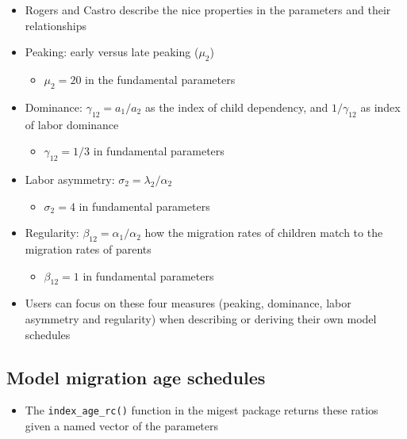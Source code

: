 \documentclass[
]{book}
\providecommand{\tightlist}{%
  \setlength{\itemsep}{0pt}\setlength{\parskip}{0pt}}
\begin{document}
\begin{itemize}
\tightlist
\item
  Rogers and Castro describe the nice properties in the parameters and their relationships
\item
  Peaking: early versus late peaking (\(\mu_2\))

  \begin{itemize}
  \tightlist
  \item
    \(\mu_2 = 20\) in the fundamental parameters
  \end{itemize}
\item
  Dominance: \(\gamma_{12} = a_1/a_2\) as the index of child dependency, and \(1/\gamma_{12}\) as index of labor dominance

  \begin{itemize}
  \tightlist
  \item
    \(\gamma_{12} = 1/3\) in fundamental parameters
  \end{itemize}
\item
  Labor asymmetry: \(\sigma_2 = \lambda_2/\alpha_2\)

  \begin{itemize}
  \tightlist
  \item
    \(\sigma_{2} = 4\) in fundamental parameters
  \end{itemize}
\item
  Regularity: \(\beta_{12} = \alpha_1/\alpha_2\) how the migration rates of children match to the migration rates of parents

  \begin{itemize}
  \tightlist
  \item
    \(\beta_{12} = 1\) in fundamental parameters
  \end{itemize}
\item
  Users can focus on these four measures (peaking, dominance, labor asymmetry and regularity) when describing or deriving their own model schedules
\end{itemize}

\hypertarget{model-migration-age-schedules-3}{%
\subsection{Model migration age schedules}\label{model-migration-age-schedules-3}}

\begin{itemize}
\tightlist
\item
  The \texttt{index\_age\_rc()} function in the migest package returns these ratios given a named vector of the parameters
\end{itemize}
\end{document}
